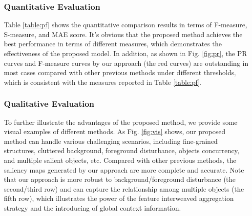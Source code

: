 \documentclass[letterpaper]{article} \usepackage{aaai20}  \usepackage{times}  \usepackage{helvet} \usepackage{courier}  \usepackage[hyphens]{url}  \usepackage{graphicx} \urlstyle{rm} \def\UrlFont{\rm}  \usepackage{graphicx}  \frenchspacing  \setlength{\pdfpagewidth}{8.5in}  \setlength{\pdfpageheight}{11in}
\begin{document}
\subsubsection{Quantitative Evaluation}
Table \ref{table:pf} shows the quantitative comparison results in terms of F-measure, S-measure, and MAE score.  
It's obvious that the proposed method achieves the best performance in terms of different measures, 
which demonstrates the effectiveness of the proposed model. 
In addition, as shown in Fig. \ref{fig:pr}, the PR curves and F-measure curves by our approach (the red curves) are outstanding in most cases compared with
other previous methods under different thresholds, which is consistent with the measures reported in Table \ref{table:pf}.
\subsubsection{Qualitative Evaluation}
To further illustrate the advantages of the proposed method, 
we provide some visual examples of different methods.
As Fig. \ref{fig:vis} shows, our proposed method can handle various challenging scenarios, including fine-grained structures,
cluttered background, foreground disturbance, objects concurrency, and multiple salient objects, etc.
Compared with other previous methods, the saliency maps generated by our approach are more complete and accurate. Note that our approach is more robust to background/foreground disturbance (the second/third row) and can capture the relationship among multiple objects (the fifth row), which illustrates the power of the feature interweaved aggregation strategy and the introducing of global context information.
\end{document}
